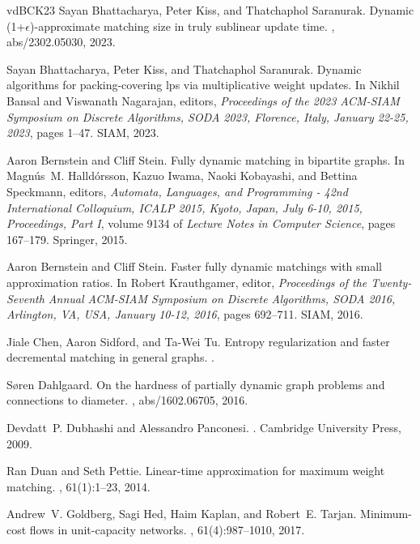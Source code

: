 \documentclass[a4paper,11pt]{article}
\theoremstyle{definition}
\theoremstyle{definition}
\theoremstyle{definition}
\theoremstyle{definition}
\theoremstyle{definition}
\theoremstyle{definition}
\theoremstyle{definition}
\theoremstyle{definition}
\theoremstyle{definition}
\theoremstyle{definition}
\theoremstyle{definition}
\theoremstyle{definition}
\theoremstyle{definition}
\theoremstyle{definition}
\theoremstyle{definition}
\begin{document}
\begin{thebibliography}{vdBCK{\etalchar{+}}23}
Sayan Bhattacharya, Peter Kiss, and Thatchaphol Saranurak.
\newblock Dynamic {\textdollar}(1+{\(\epsilon\)}){\textdollar}-approximate
  matching size in truly sublinear update time.
, abs/2302.05030, 2023.

Sayan Bhattacharya, Peter Kiss, and Thatchaphol Saranurak.
\newblock Dynamic algorithms for packing-covering lps via multiplicative weight
  updates.
\newblock In Nikhil Bansal and Viswanath Nagarajan, editors, {\em Proceedings
  of the 2023 {ACM-SIAM} Symposium on Discrete Algorithms, {SODA} 2023,
  Florence, Italy, January 22-25, 2023}, pages 1--47. {SIAM}, 2023.

Aaron Bernstein and Cliff Stein.
\newblock Fully dynamic matching in bipartite graphs.
\newblock In Magn{\'{u}}s~M. Halld{\'{o}}rsson, Kazuo Iwama, Naoki Kobayashi,
  and Bettina Speckmann, editors, {\em Automata, Languages, and Programming -
  42nd International Colloquium, {ICALP} 2015, Kyoto, Japan, July 6-10, 2015,
  Proceedings, Part {I}}, volume 9134 of {\em Lecture Notes in Computer
  Science}, pages 167--179. Springer, 2015.

Aaron Bernstein and Cliff Stein.
\newblock Faster fully dynamic matchings with small approximation ratios.
\newblock In Robert Krauthgamer, editor, {\em Proceedings of the Twenty-Seventh
  Annual {ACM-SIAM} Symposium on Discrete Algorithms, {SODA} 2016, Arlington,
  VA, USA, January 10-12, 2016}, pages 692--711. {SIAM}, 2016.

Jiale Chen, Aaron Sidford, and Ta-Wei Tu.
\newblock Entropy regularization and faster decremental matching in general
  graphs.
.

S{\o}ren Dahlgaard.
\newblock On the hardness of partially dynamic graph problems and connections
  to diameter.
, abs/1602.06705, 2016.

Devdatt~P. Dubhashi and Alessandro Panconesi.
.
\newblock Cambridge University Press, 2009.

Ran Duan and Seth Pettie.
\newblock Linear-time approximation for maximum weight matching.
, 61(1):1--23, 2014.

Andrew~V. Goldberg, Sagi Hed, Haim Kaplan, and Robert~E. Tarjan.
\newblock Minimum-cost flows in unit-capacity networks.
, 61(4):987--1010, 2017.


\end{thebibliography}
\end{document}
